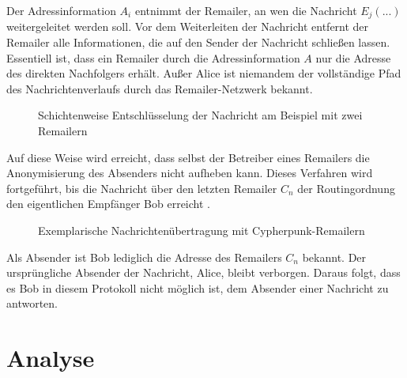 Der Adressinformation \(A_i\) entnimmt der Remailer, an wen die Nachricht \(E_j(...)\) weitergeleitet werden soll. Vor dem Weiterleiten der Nachricht entfernt der Remailer alle Informationen, die auf den Sender der Nachricht schließen lassen. Essentiell ist, dass ein Remailer durch die Adressinformation \(A\) nur die Adresse des direkten Nachfolgers erhält. Außer Alice ist niemandem der vollständige Pfad des Nachrichtenverlaufs durch das Remailer-Netzwerk bekannt.

\begin{figure}
	\centering

	\caption{Schichtenweise Entschlüsselung der Nachricht am Beispiel mit zwei Remailern}
\end{figure}

Auf diese Weise wird erreicht, dass selbst der Betreiber eines Remailers die Anonymisierung des Absenders nicht aufheben kann. Dieses Verfahren wird fortgeführt, bis die Nachricht über den letzten Remailer \(C_n\) der Routingordnung den eigentlichen Empfänger Bob erreicht \cite[S. 72ff.]{kubieziel2007anonym}.

\begin{figure}
	\begin{center}
		\def\svgwidth{0.8 \linewidth}
		
		\caption{Exemplarische Nachrichtenübertragung mit Cypherpunk-Remailern}
	\end{center}
\end{figure}

Als Absender ist Bob lediglich die Adresse des Remailers \(C_n\) bekannt. Der ursprüngliche Absender der Nachricht, Alice, bleibt verborgen. Daraus folgt, dass es Bob in diesem Protokoll nicht möglich ist, dem Absender einer Nachricht zu antworten.

\section{Analyse}

